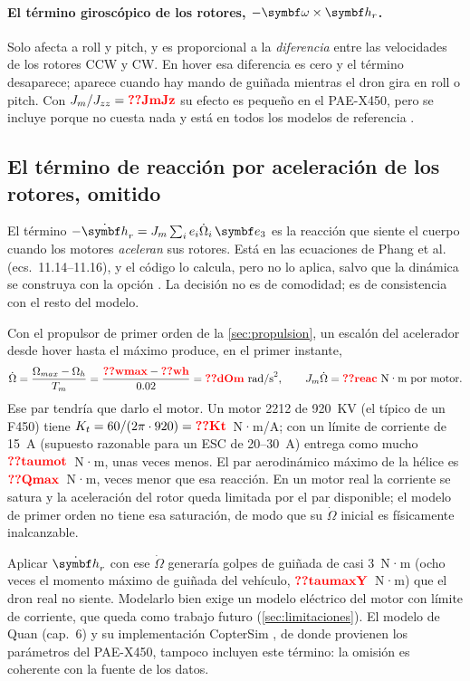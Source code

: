 \paragraph{El término giroscópico de los rotores, $-\vect\omega\times\vect h_r$.}
Solo afecta a roll y pitch, y es proporcional a la \emph{diferencia} entre
las velocidades de los rotores CCW y CW. En hover esa diferencia es cero y el
término desaparece; aparece cuando hay mando de guiñada mientras el dron
gira en roll o pitch. Con $J_m/J_{zz}=\val{JmJz}$ su efecto es pequeño en el
PAE-X450, pero se incluye porque no cuesta nada y está en todos los modelos
de referencia \cite{qq17,hb11}.

\subsection{El término de reacción por aceleración de los rotores, omitido}
\label{sec:reaccion}

El término $-\dot{\vect h}_r = J_m\sum_i e_i\dot\Omega_i\,\vect e_3$ es la
reacción que siente el cuerpo cuando los motores \emph{aceleran} sus rotores.
Está en las ecuaciones de Phang et al.\ \cite{hb11} (ecs.~11.14--11.16), y el
código lo calcula, pero no lo aplica, salvo que la dinámica se construya
con la opción . La decisión no es
de comodidad; es de consistencia con el resto del modelo.

Con el propulsor de primer orden de la \cref{sec:propulsion}, un escalón del
acelerador desde hover hasta el máximo produce, en el primer instante,
\begin{equation}
\dot\Omega = \frac{\Omega_{max}-\Omega_h}{T_m}
= \frac{\val{wmax}-\val{wh}}{0.02} = \val{dOm}\ \text{rad/s}^2,
\qquad
J_m\dot\Omega = \val{reac}\ \text{N·m por motor}.
\end{equation}
Ese par tendría que darlo el motor. Un motor 2212 de 920~KV (el típico de un
F450) tiene $K_t = 60/(2\pi\cdot920) = \val{Kt}$~N·m/A; con un límite de
corriente de 15~A (supuesto razonable para un ESC de 20--30~A) entrega como
mucho $\val{taumot}$~N·m, unas  veces menos. El par
aerodinámico máximo de la hélice es $\val{Qmax}$~N·m, 
veces menor que esa reacción. En un motor real la corriente se satura y la
aceleración del rotor queda limitada por el par disponible; el modelo de
primer orden no tiene esa saturación, de modo que su $\dot\Omega$ inicial es
físicamente inalcanzable.

Aplicar $\dot{\vect h}_r$ con ese $\dot\Omega$ generaría golpes de guiñada
de casi 3~N·m (ocho veces el momento máximo de guiñada del vehículo,
$\val{taumaxY}$~N·m) que el dron real no siente. Modelarlo bien exige un
modelo eléctrico del motor con límite de corriente, que queda como trabajo
futuro (\cref{sec:limitaciones}). El modelo de Quan \cite{qq17} (cap.~6) y
su implementación CopterSim \cite{cs19}, de donde provienen los parámetros
del PAE-X450, tampoco incluyen este término: la omisión es coherente con la
fuente de los datos.


